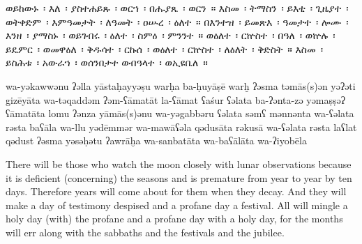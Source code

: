 
\clearpage
\begin{ethiopictext}
    ወይከውኑ~፡ እለ~፡ ያስተሐይጹ~፡ ወርኀ~፡
    በሑያጼ~፡ ወርን~። እስመ~፡ ትማስን~፡ ይእቲ~፡ ጊዜያተ~፡ ወትቀድም~፡
    እምዓመታት~፡ ለዓመት~፡ ዐሡረ~፡ ዕለተ~።
    በእንተዝ~፡ ይመጽእ~፡
    ዓመታተ~፡ ሎሙ~፡ እንዘ~፡ ያማስኑ~፡ ወይገብሩ~፡ ዕለተ~፡ ስምዕ~፡
    ምንንተ~። ወዕለተ~፡ ርኵስተ~፡ በዓለ~፡ ወኵሉ~፡ ይዴምር~፡ ወመዋዕለ~፡ 
    ቅዱሳተ~፡ ርኩሰ~፡ ወዕለተ~፡ ርኵስተ~፡ ለዕለት~፡ ቅድስት~። እስመ~፡
    ይስሕቱ~፡ አውራኀ~፡ ወሰንበታተ ወብዓላተ~፡ ወኢዩቤለ~።
\end{ethiopictext}
\begin{transliteration}
    wa-yəkawwənu ʔəlla yāstaḥayyəṣu warḥa 
    ba-ḥuyāṣē warḫ ʔəsma təmās(s)ən yəʔəti gizēyāta wa-təqaddəm 
    ʔəm-ʕāmatāt la-ʕāmat ʕaśur ʕəlata
    ba-ʔənta-zə yəmaṣṣəʔ 
    ʕāmatāta lomu ʔənza yāmās(s)ənu wa-yəgabbəru ʕəlata səmʕ 
    mənnənta wa-ʕəlata rəsta baʕāla wa-llu yədēmmər wa-mawāʕəla 
    qədusāta rəkusā wa-ʕəlata rəsta laʕlat qədust ʔəsma
    yəsəḥətu ʔawrāḫa wa-sanbatāta wa-baʕālāta wa-ʔiyobēla
\end{transliteration}
\begin{translation}
    There will be those who watch the moon closely with lunar observations
    because it is deficient (concerning) the seasons and is premature from year to year by ten days. 
    Therefore
    years will come about for them when they decay. And they will make a day of
    testimony despised and a profane day a festival. All will mingle a holy day
    (with) the profane and a profane day with a holy day, for
    the months will err along with the sabbaths and the festivals and the jubilee.
\end{translation}